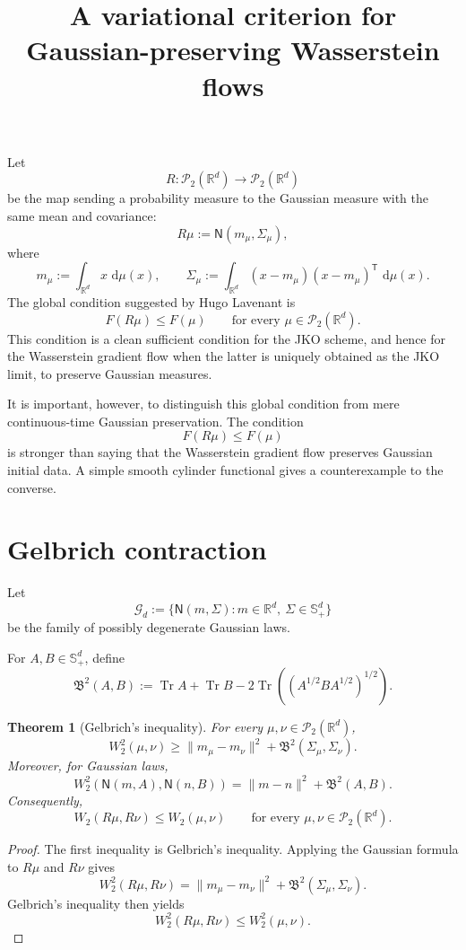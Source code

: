 \documentclass[11pt]{article}
\title{A variational criterion for Gaussian-preserving Wasserstein flows}
\author{}
\date{}
\newtheorem{theorem}{Theorem}
\DeclareMathOperator{\Tr}{Tr}
\newcommand{\R}{\mathbb R}
\newcommand{\W}{W}
\newcommand{\N}{\mathsf N}
\newcommand{\dd}{\,\mathrm d}
\begin{document}
\maketitle

Let
\[
R:\mathcal P_2(\R^d)\to\mathcal P_2(\R^d)
\]
be the map sending a probability measure to the Gaussian measure with the same
mean and covariance:
\[
R\mu:=\N(m_\mu,\Sigma_\mu),
\]
where
\[
m_\mu:=\int_{\R^d}x\,\dd\mu(x),
\qquad
\Sigma_\mu:=\int_{\R^d}(x-m_\mu)(x-m_\mu)^{\mathsf T}\,\dd\mu(x).
\]
The global condition suggested by Hugo Lavenant is
\[
F(R\mu)\le F(\mu)
\qquad
\text{for every }\mu\in\mathcal P_2(\R^d).
\]
This condition is a clean sufficient condition for the JKO scheme, and hence
for the Wasserstein gradient flow when the latter is uniquely obtained as the
JKO limit, to preserve Gaussian measures.

It is important, however, to distinguish this global condition from mere
continuous-time Gaussian preservation. The condition
\[
F(R\mu)\le F(\mu)
\]
is stronger than saying that the Wasserstein gradient flow preserves Gaussian
initial data. A simple smooth cylinder functional gives a counterexample to the
converse.

\section{Gelbrich contraction}

Let
\[
\mathcal G_d
:=
\{\N(m,\Sigma):m\in\R^d,\ \Sigma\in\mathbb S_+^d\}
\]
be the family of possibly degenerate Gaussian laws.

For $A,B\in\mathbb S_+^d$, define
\[
\mathfrak B^2(A,B)
:=
\Tr A+\Tr B
-
2\Tr\!\left((A^{1/2}BA^{1/2})^{1/2}\right).
\]

\begin{theorem}[Gelbrich's inequality]
For every $\mu,\nu\in\mathcal P_2(\R^d)$,
\[
\W_2^2(\mu,\nu)
\ge
\|m_\mu-m_\nu\|^2+\mathfrak B^2(\Sigma_\mu,\Sigma_\nu).
\]
Moreover, for Gaussian laws,
\[
\W_2^2(\N(m,A),\N(n,B))
=
\|m-n\|^2+\mathfrak B^2(A,B).
\]
Consequently,
\[
\W_2(R\mu,R\nu)\le \W_2(\mu,\nu)
\qquad
\text{for every }\mu,\nu\in\mathcal P_2(\R^d).
\]
\end{theorem}

\begin{proof}
The first inequality is Gelbrich's inequality. Applying the Gaussian formula to
$R\mu$ and $R\nu$ gives
\[
\W_2^2(R\mu,R\nu)
=
\|m_\mu-m_\nu\|^2+\mathfrak B^2(\Sigma_\mu,\Sigma_\nu).
\]
Gelbrich's inequality then yields
\[
\W_2^2(R\mu,R\nu)\le \W_2^2(\mu,\nu).
\]
\end{proof}
\end{document}
